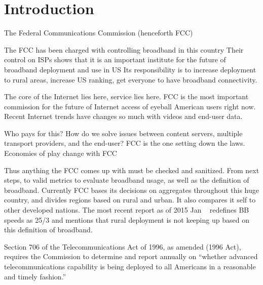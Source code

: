 \section{Introduction}
\label{sec:intro}

The Federal Communications Commission (henceforth FCC)



The FCC has been charged with controlling broadband in this country
Their control on ISPs shows that it is an important institute for the future of broadband deployment and use in US
Its responsibility is to increase deployment to rural areas, increase US ranking, get everyone to have broadband connectivity.


The core of the Internet lies here, service lies here. FCC is the most important commission for the future of Internet access of eyeball American users right now.
Recent Internet trends have changes so much with videos and end-user data.


Who pays for this? How do we solve issues between content servers, multiple transport providers, and the end-user? FCC is the one setting down the laws. Economies of play change with FCC



Thus anything the FCC comes up with must be checked and sanitized. From next steps, to valid metrics to evaluate broadband usage, as well as the definition of broadband. Currently FCC bases its decisions on aggregates throughout this huge country, and divides regions based on rural and urban. It also compares it self to other developed nations. The most recent report as of 2015 Jan ~\cite{fcc2015broadband-report} redefines BB speeds as 25/3 and mentions that rural deployment is not keeping up based on this definition of broadband.

Section 706 of the Telecommunications Act of 1996, as amended (1996 Act), requires the Commission to determine and report annually on ``whether advanced telecommunications capability is being deployed to all Americans in a reasonable and timely fashion.''

